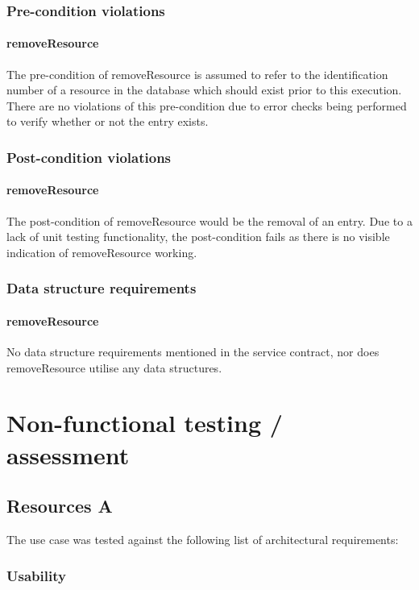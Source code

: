 \documentclass[a4paper]{article}
\begin{document}
\subsubsection {Pre-condition violations}

\paragraph{removeResource}
The pre-condition of removeResource is assumed to refer to the identification number of a resource in the database which should exist prior to this execution. There are no violations of this pre-condition due to error checks being performed to verify whether or not the entry exists.

\subsubsection {Post-condition violations}

\paragraph{removeResource}
The post-condition of removeResource would be the removal of an entry. Due to a lack of unit testing functionality, the post-condition fails as there is no visible indication of removeResource working.

\subsubsection {Data structure requirements}

\paragraph{removeResource}
No data structure requirements mentioned in the service contract, nor does removeResource utilise any data structures.

\section {Non-functional testing / assessment}
\subsection {Resources A}
The use case was tested against the following list of architectural requirements:
\subsubsection {Usability}
\end{document}
